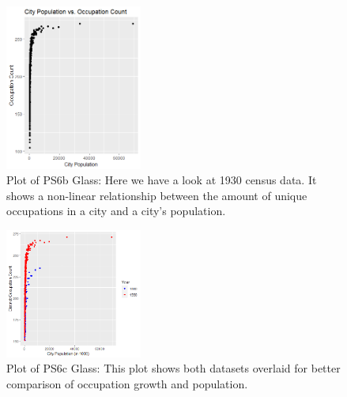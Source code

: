 \documentclass{article}
\begin{document}
\begin{figure}[h]
    \centering
    \includegraphics[width=0.4\textwidth]{PS6b_Glass.png}
    \caption{Plot of PS6b Glass: Here we have a look at 1930 census data. It shows a non-linear relationship between the amount of unique occupations in a city and a city's population.}
    \label{fig:PS6b_Glass}
\end{figure}

\begin{figure}[h]
    \centering
    \includegraphics[width=0.4\textwidth]{PS6c_Glass.png}
    \caption{Plot of PS6c Glass: This plot shows both datasets overlaid for better comparison of occupation growth and population.}
    \label{fig:PS6c_Glass}
\end{figure}
\end{document}
